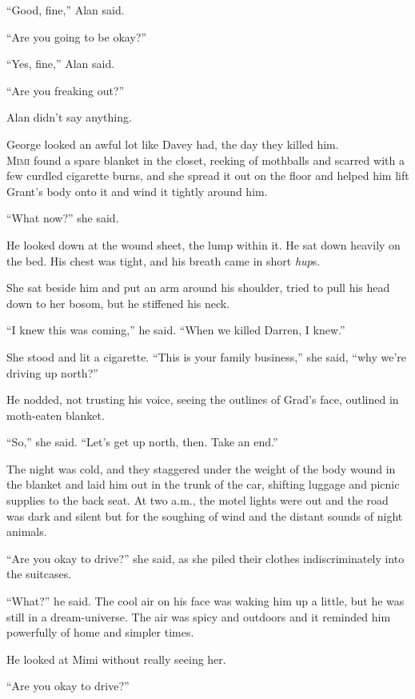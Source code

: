 \documentclass{article}
\begin{document}
``Good, fine,'' Alan said.

``Are you going to be okay?''

``Yes, fine,'' Alan said.

``Are you freaking out?''

Alan didn't say anything.

George looked an awful lot like Davey had, the day they killed him.
\\
\lettrine[lines=3, lhang=.5, nindent=0pt, findent=2pt]{M}{imi} found a spare blanket in the closet, reeking of mothballs and
scarred with a few curdled cigarette burns, and she spread it out on
the floor and helped him lift Grant's body onto it and wind it tightly
around him.

``What now?'' she said.

He looked down at the wound sheet, the lump within it.  He sat down
heavily on the bed.  His chest was tight, and his breath came in short
\textit{hup}s.

She sat beside him and put an arm around his shoulder, tried to pull
his head down to her bosom, but he stiffened his neck.

``I knew this was coming,'' he said.  ``When we killed Darren, I
knew.''

She stood and lit a cigarette.  ``This is your family business,'' she
said, ``why we're driving up north?''

He nodded, not trusting his voice, seeing the outlines of Grad's face,
outlined in moth-eaten blanket.

``So,'' she said.  ``Let's get up north, then.  Take an end.''

The night was cold, and they staggered under the weight of the body
wound in the blanket and laid him out in the trunk of the car,
shifting luggage and picnic supplies to the back seat.  At two a.m.,
the motel lights were out and the road was dark and silent but for the
soughing of wind and the distant sounds of night animals.

``Are you okay to drive?'' she said, as she piled their clothes
indiscriminately into the suitcases.

``What?'' he said.  The cool air on his face was waking him up a
little, but he was still in a dream-universe.  The air was spicy and
outdoors and it reminded him powerfully of home and simpler times.

He looked at Mimi without really seeing her.

``Are you okay to drive?''
\end{document}
